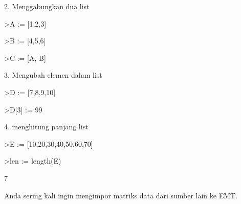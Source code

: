 \documentclass[a4paper,10pt]{article}
\begin{document}
\begin{eulernotebook}
\begin{eulercomment}
\begin{eulercomment}
\begin{eulercomment}
\begin{eulercomment}
\begin{eulercomment}
\begin{eulercomment}
\begin{eulercomment}
\begin{eulercomment}
\begin{eulercomment}
\begin{eulercomment}
\begin{eulercomment}
\begin{eulercomment}
\begin{eulercomment}
\begin{eulercomment}
\begin{eulercomment}
2. Menggabungkan dua list
\end{eulercomment}
\begin{eulerprompt}
>A := [1,2,3]
\end{eulerprompt}
\begin{euleroutput}
  [1,  2,  3]
\end{euleroutput}
\begin{eulerprompt}
>B := [4,5,6]
\end{eulerprompt}
\begin{euleroutput}
  [4,  5,  6]
\end{euleroutput}
\begin{eulerprompt}
>C := [A, B]
\end{eulerprompt}
\begin{euleroutput}
  [1,  2,  3,  4,  5,  6]
\end{euleroutput}
\begin{eulercomment}
3. Mengubah elemen dalam list
\end{eulercomment}
\begin{eulerprompt}
>D := [7,8,9,10]
\end{eulerprompt}
\begin{euleroutput}
  [7,  8,  9,  10]
\end{euleroutput}
\begin{eulerprompt}
>D[3] := 99
\end{eulerprompt}
\begin{euleroutput}
  [7,  8,  99,  10]
\end{euleroutput}
\begin{eulercomment}
4. menghitung panjang list
\end{eulercomment}
\begin{eulerprompt}
>E := [10,20,30,40,50,60,70]
\end{eulerprompt}
\begin{euleroutput}
  [10,  20,  30,  40,  50,  60,  70]
\end{euleroutput}
\begin{eulerprompt}
>len := length(E)
\end{eulerprompt}
\begin{euleroutput}
  7
\end{euleroutput}
\begin{eulercomment}
\begin{eulercomment}
\begin{eulercomment}
Anda sering kali ingin mengimpor matriks data dari sumber lain ke EMT.

\end{eulercomment}
\end{eulercomment}
\end{eulercomment}
\end{eulercomment}
\end{eulercomment}
\end{eulercomment}
\end{eulercomment}
\end{eulercomment}
\end{eulercomment}
\end{eulercomment}
\end{eulercomment}
\end{eulercomment}
\end{eulercomment}
\end{eulercomment}
\end{eulercomment}
\end{eulercomment}
\end{eulercomment}
\end{eulernotebook}
\end{document}
